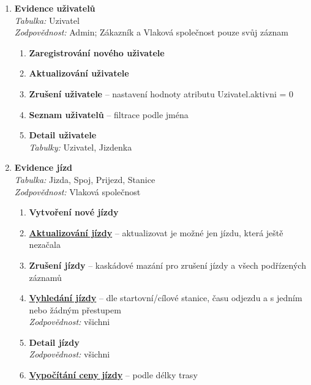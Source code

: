 \documentclass[11pt]{article}
\begin{document}
\begin{enumerate}
    \item \textbf{Evidence uživatelů}\\
        \textit{Tabulka:} Uzivatel\\
        \textit{Zodpovědnost:} Admin; Zákazník a Vlaková společnost pouze svůj záznam
        \begin{enumerate}
            \item \textbf{Zaregistrování nového uživatele}
            \item \textbf{Aktualizování uživatele}
            \item \textbf{Zrušení uživatele} – nastavení hodnoty atributu Uzivatel.aktivni = 0
            \item \textbf{Seznam uživatelů} – filtrace podle jména
            \item \textbf{Detail uživatele}\\
            \textit{Tabulky:} Uzivatel, Jizdenka
        \end{enumerate}

    \item \textbf{Evidence jízd}\\
        \textit{Tabulka:} Jizda, Spoj, Prijezd, Stanice\\
        \textit{Zodpovědnost:} Vlaková společnost
        \begin{enumerate}
            \item \textbf{Vytvoření nové jízdy}
            \item \underline{\textbf{Aktualizování jízdy}} – aktualizovat je možné jen jízdu, která ještě nezačala
            \item \textbf{Zrušení jízdy} – kaskádové mazání pro zrušení jízdy a všech podřízených záznamů
            \item \underline{\textbf{Vyhledání jízdy}} – dle startovní/cílové stanice, času odjezdu a s jedním nebo žádným přestupem\\
            \textit{Zodpovědnost:} všichni
            \item \textbf{Detail jízdy}\\
            \textit{Zodpovědnost:} všichni
            \item \underline{\textbf{Vypočítání ceny jízdy}} – podle délky trasy
        \end{enumerate}


\end{enumerate}
\end{document}
